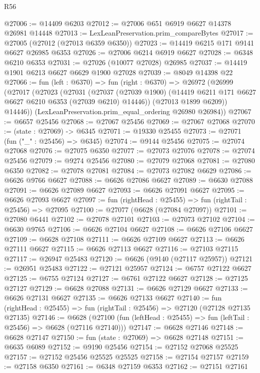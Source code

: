 \begin{lexlean}{R56}
\begin{coremodule}
@27006 := @14409 @6203
@27012 := @27006 @651 @6919 @6627 @14378 @26981 @14448
@27013 := LexLeanPreservation.prim_compareBytes
@27017 := @27005 (@27012 (@27013 @6359 @6350))
@27023 := @14419 @6215 @171 @9141 @6627 @26985 @6353
@27026 := @27006 @6214 @6919 @6627
@27028 := @6348 @6210 @6353
@27031 := @27026 (@10077 @27028) @26985
@27037 := @14419 @1901 @6213 @6627 @6629 @1900 @27028
@27039 := @8049 @14398 @22
@27066 := fun (left : @6370) =>
  fun (right : @6370) =>
  @26972
    (@26999
      (@27017
        (@27023
          (@27031
            (@27037
              (@27039 @1900)
              (@14419 @6211 @171 @6627 @6627 @6210 @6353 (@27039 @6210) @14446))
            (@27013 @1899 @6209))
          @14446))
      (LexLeanPreservation.prim_equal_ordering @26980 @26984))
@27067 := @6657 @25456
@27068 := @27067 @25456
@27069 := @27067 @27068
@27070 := (state : @27069) -> @6345
@27071 := @19330 @25455
@27073 := @27071 (fun ("_" : @25456) => @6345)
@27074 := @9144 @25456
@27075 := @27074 @27068
@27076 := @27075 @6350
@27077 := @27073 @27076
@27078 := @27074 @25456
@27079 := @9274 @25456
@27080 := @27079 @27068
@27081 := @27080 @6350
@27082 := @27078 @27081
@27084 := @27073 @27082 @6629
@27086 := @6626 @9766 @6627
@27088 := @6626 @27086 @6627
@27089 := @6630 @27088
@27091 := @6626 @27089 @6627
@27093 := @6626 @27091 @6627
@27095 := @6626 @27093 @6627
@27097 := fun (rightHead : @25455) => fun (rightTail : @25456) => @27095
@27100 := @27077 (@6628 (@27084 @27097))
@27101 := @27080 @6441
@27102 := @27078 @27101
@27103 := @27073 @27102
@27104 := @6630 @9765
@27106 := @6626 @27104 @6627
@27108 := @6626 @27106 @6627
@27109 := @6628 @27108
@27111 := @6626 @27109 @6627
@27113 := @6626 @27111 @6627
@27115 := @6626 @27113 @6627
@27116 := @27103 @27115
@27117 := @26947 @25483
@27120 := @6626 (@9140 (@27117 @25957))
@27121 := @26951 @25483
@27122 := @27121 @25957
@27124 := @6757 @27122 @6627
@27125 := @6755 @27124
@27127 := @6761 @27122 @6627
@27128 := @27125 @27127
@27129 := @6628 @27088
@27131 := @6626 @27129 @6627
@27133 := @6626 @27131 @6627
@27135 := @6626 @27133 @6627
@27140 := fun (rightHead : @25455) => fun (rightTail : @25456) => @27120 (@27128 @27135 @27135)
@27146 := @6628
    (@27100 (fun (leftHead : @25455) => fun (leftTail : @25456) => @6628 (@27116 @27140)))
@27147 := @6628 @27146
@27148 := @6628 @27147
@27150 := fun (state : @27069) => @6628 @27148
@27151 := @6635 @6089
@27152 := @9190 @25456
@27154 := @27152 @27068 @25525
@27157 := @27152 @25456 @25525 @25525
@27158 := @27154 @27157
@27159 := @27158 @6350
@27161 := @6348 @27159 @6353
@27162 := @27151 @27161

\end{coremodule}
\end{lexlean}
